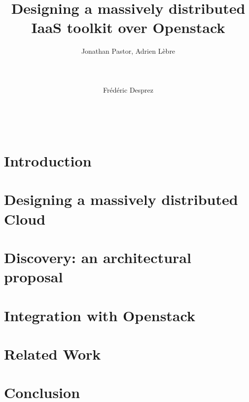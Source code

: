 \documentclass{acm/acm_proc_article-sp}
\begin{document}
\title{Designing a massively distributed IaaS toolkit over Openstack}

\author{
%
Jonathan Pastor, Adrien Lèbre\\
       \\
       \\
       \\
\alignauthor
Frédéric Desprez\\
       \\
       \\
       \\
}

\maketitle




\section{Introduction}
\label{sec:intro} 


\section{Designing a massively distributed Cloud}
\label{sec:design}


\section{Discovery: an architectural proposal}
\label{sec:architecture}


\section{Integration with Openstack}
\label{sec:integration}


\section{Related Work}
\label{sec:related}


\section{Conclusion}
\label{sec:con}





\end{document}
